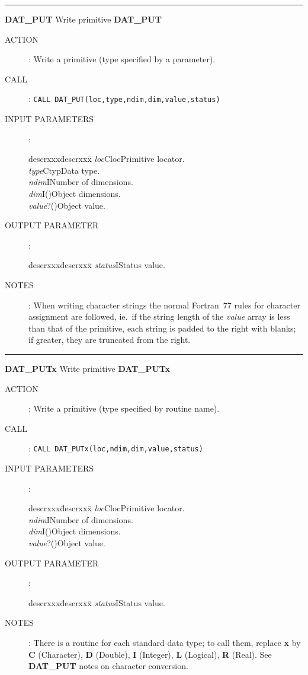 \goodbreak
\rule{\textwidth}{0.3mm}
{\Large {\bf DAT\_PUT} \hfill Write primitive \hfill {\bf DAT\_PUT}}
\begin{description}
\item [ACTION]:
Write a primitive (type specified by a parameter).
\item [CALL]:
{\tt CALL DAT\_PUT(loc,type,ndim,dim,value,status)}
\item [INPUT PARAMETERS]:
\begin{tabbing}
descrxxx\=descrxxx\=\kill
{\em loc}\>Cloc\>Primitive locator.\\
{\em type}\>Ctyp\>Data type.\\
{\em ndim}\>I\>Number of dimensions.\\
{\em dim}\>I()\>Object dimensions.\\
{\em value}\>?()\>Object value.
\end{tabbing}
\item [OUTPUT PARAMETER]:
\begin{tabbing}
descrxxx\=descrxxx\=\kill
{\em status}\>I\>Status value.
\end{tabbing}
\item [NOTES]:
When writing character strings the normal Fortran~77 rules for
character assignment are followed, ie.\ if the string length of the {\em value}
array is less than that of the primitive, each string is padded to the
right with blanks; if greater, they are truncated from the right.
\end{description}
\goodbreak
\rule{\textwidth}{0.3mm}
{\Large {\bf DAT\_PUTx} \hfill Write primitive \hfill {\bf DAT\_PUTx}}
\begin{description}
\item [ACTION]:
Write a primitive (type specified by routine name).
\item [CALL]:
{\tt CALL DAT\_PUTx(loc,ndim,dim,value,status)}
\item [INPUT PARAMETERS]:
\begin{tabbing}
descrxxx\=descrxxx\=\kill
{\em loc}\>Cloc\>Primitive locator.\\
{\em ndim}\>I\>Number of dimensions.\\
{\em dim}\>I()\>Object dimensions.\\
{\em value}\>?()\>Object value.
\end{tabbing}
\item [OUTPUT PARAMETER]:
\begin{tabbing}
descrxxx\=descrxxx\=\kill
{\em status}\>I\>Status value.
\end{tabbing}
\item [NOTES]:
There is a routine for each standard data type; to call them, replace {\bf x}
by {\bf C} (Character), {\bf D} (Double), {\bf I} (Integer), {\bf L} (Logical),
{\bf R} (Real).
See {\bf DAT\_PUT} notes on character conversion.
\end{description}
